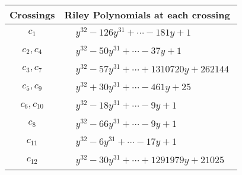 \documentclass[1p]{elsarticle_modified}
\theoremstyle{definition}
\begin{document}
\begin{tabular}{m{50pt}|m{274pt}}
Crossings & \hspace{64pt}Riley Polynomials at each crossing \\
\hline $$\begin{aligned}c_{1}\end{aligned}$$&$\begin{aligned}
&y^{32}-126 y^{31}+\cdots-181 y+1
\end{aligned}$\\
\hline $$\begin{aligned}c_{2},c_{4}\end{aligned}$$&$\begin{aligned}
&y^{32}-50 y^{31}+\cdots-37 y+1
\end{aligned}$\\
\hline $$\begin{aligned}c_{3},c_{7}\end{aligned}$$&$\begin{aligned}
&y^{32}-57 y^{31}+\cdots+1310720 y+262144
\end{aligned}$\\
\hline $$\begin{aligned}c_{5},c_{9}\end{aligned}$$&$\begin{aligned}
&y^{32}+30 y^{31}+\cdots-461 y+25
\end{aligned}$\\
\hline $$\begin{aligned}c_{6},c_{10}\end{aligned}$$&$\begin{aligned}
&y^{32}-18 y^{31}+\cdots-9 y+1
\end{aligned}$\\
\hline $$\begin{aligned}c_{8}\end{aligned}$$&$\begin{aligned}
&y^{32}-66 y^{31}+\cdots-9 y+1
\end{aligned}$\\
\hline $$\begin{aligned}c_{11}\end{aligned}$$&$\begin{aligned}
&y^{32}-6 y^{31}+\cdots-17 y+1
\end{aligned}$\\
\hline $$\begin{aligned}c_{12}\end{aligned}$$&$\begin{aligned}
&y^{32}-30 y^{31}+\cdots+1291979 y+21025
\end{aligned}$\\
\hline
\end{tabular}\\~\\
\end{document}

